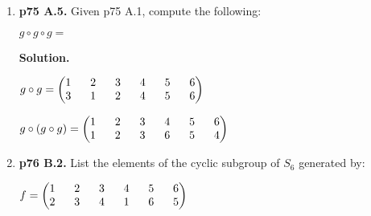 \documentclass[11pt]{article}
\begin{document}
\begin{enumerate}
\item {\bfseries p75 A.5.} Given p75 A.1, compute the following:

	$g \circ g \circ g = $
  
	{\bfseries Solution.}
	
	$g \circ g = \begin{pmatrix}
		1 \hspace{6mm} 2 \hspace{6mm} 3 \hspace{6mm} 4 \hspace{6mm} 5 \hspace{6mm} 6 \\
		3 \hspace{6mm} 1 \hspace{6mm} 2 \hspace{6mm} 4 \hspace{6mm} 5 \hspace{6mm} 6
	\end{pmatrix}$
	
	$g \circ (g \circ g) = \begin{pmatrix}
		1 \hspace{6mm} 2 \hspace{6mm} 3 \hspace{6mm} 4 \hspace{6mm} 5 \hspace{6mm} 6 \\
		1 \hspace{6mm} 2 \hspace{6mm} 3 \hspace{6mm} 6 \hspace{6mm} 5 \hspace{6mm} 4
	\end{pmatrix}$
  
\newpage

\item {\bfseries p76 B.2.} List the elements of the cyclic subgroup of $S_6$ generated by:

	$f = \begin{pmatrix}
		1 \hspace{6mm} 2 \hspace{6mm} 3 \hspace{6mm} 4 \hspace{6mm} 5 \hspace{6mm} 6 \\
		2 \hspace{6mm} 3 \hspace{6mm} 4 \hspace{6mm} 1 \hspace{6mm} 6 \hspace{6mm} 5
	\end{pmatrix}$
  

\end{enumerate}
\end{document}
